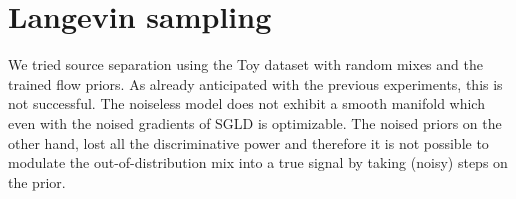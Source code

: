 \section{Langevin sampling}
We tried source separation using the Toy dataset with random mixes and the trained flow priors. As already anticipated with the previous experiments, this is not successful. The noiseless model does not exhibit a smooth manifold which even with the noised gradients of SGLD is optimizable. The noised priors on the other hand, lost all the discriminative power and therefore it is not possible to modulate the out-of-distribution mix into a true signal by taking (noisy) steps on the prior.

